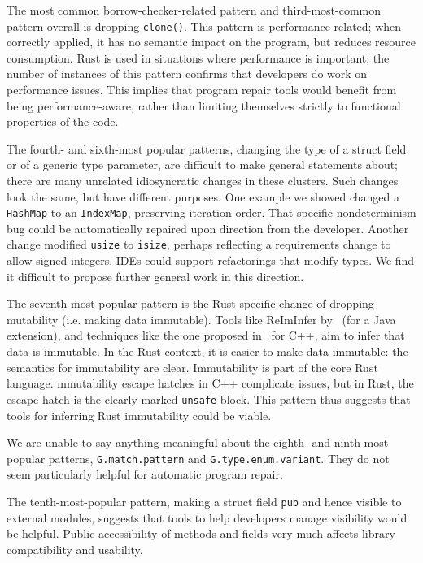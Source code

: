 The most common borrow-checker-related pattern and third-most-common pattern overall is dropping \texttt{clone()}. This pattern is performance-related; when correctly applied, it has no semantic impact on the program, but reduces resource consumption. Rust is used in situations where performance is important; the number of instances of this pattern confirms that developers do work on performance issues. This implies that program repair tools would benefit from being performance-aware, rather than limiting themselves strictly to functional properties of the code.

The fourth- and sixth-most popular patterns, changing the type of a struct field or of a generic type parameter, are difficult to make general statements about; there are many unrelated idiosyncratic changes in these clusters. Such changes look the same, but have different purposes. One example we showed changed a \texttt{HashMap} to an \texttt{IndexMap}, preserving iteration order. That specific nondeterminism bug could be automatically repaired upon direction from the developer. Another change modified \texttt{usize} to \texttt{isize}, perhaps reflecting a requirements change to allow signed integers. IDEs could support refactorings that modify types. We find it difficult to propose further general work in this direction.

The seventh-most-popular pattern is the Rust-specific change of dropping mutability (i.e. making data immutable). Tools like ReImInfer by~\cite{HuangMDE2012} (for a Java extension), and techniques like the one proposed in~\cite{EyolfsonAbstractImmutability} for C++, aim to infer that data is immutable. In the Rust context, it is easier to make data immutable: the semantics for immutability are clear. Immutability is part of the core Rust language. mmutability escape hatches in C++ complicate issues, but in Rust, the escape hatch is the clearly-marked \texttt{unsafe} block. This pattern thus suggests that tools for inferring Rust immutability could be viable.

We are unable to say anything meaningful about the eighth- and ninth-most popular patterns, \texttt{G.match.pattern} and \texttt{G.type.enum.variant}. They do not seem particularly helpful for automatic program repair.

The tenth-most-popular pattern, making a struct field \texttt{pub} and hence visible to external modules, suggests that tools to help developers manage visibility would be helpful. Public accessibility of methods and fields very much affects library compatibility and usability.

